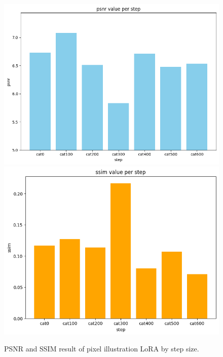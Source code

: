 \documentclass[extendedabs]{bmvc2k}
\begin{document}
\begin{figure}[t]
\centering
	\includegraphics[width=\linewidth]{images/pixel-psnr.png}
    \includegraphics[width=\linewidth]{images/pixel-ssim.png}
	\caption{
		PSNR and SSIM result of pixel illustration LoRA by step size.}
	\vspace{-2mm}
        \label{fig:pixelchart}
\end{figure}
\end{document}
